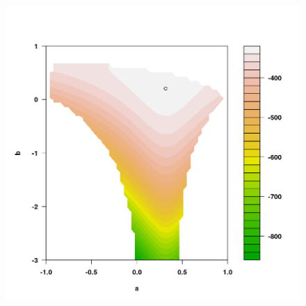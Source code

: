 \documentclass{article}
\numberwithin{equation}{section}
\begin{document}
% 
% 

\begin{figure}[H]
    \centering
    \begin{minipage}{0.55\textwidth}
        \centering
        \includegraphics[width=\textwidth]{plots/Rplot01.png}
        \label{fig:plot1}
    \end{minipage}
    \hfill
    \begin{minipage}{0.44\textwidth}
        \centering

\end{minipage}
\end{figure}
\end{document}
